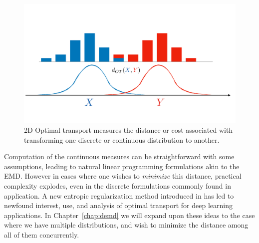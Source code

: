 \begin{figure}
	\centering
	\includegraphics[width=\textwidth,trim={0 5cm 0 10cm},clip]{2_bknd/ot.pdf}
	\caption[Distributions and Optimal Transport]{2D Optimal transport measures the distance or cost associated with transforming one discrete or continuous distribution to another.}
	\label{fig:bkndot}
\end{figure}
Computation of the continuous measures can be straightforward with some assumptions,
leading to natural linear programming formulations akin to the EMD.
However in cases where one wishes to \textit{minimize} this distance,
practical complexity explodes, even in the discrete
formulations commonly found in application.
A new entropic regularization method introduced in \cite{cuturi2013sinkhorn}
has led to newfound interest,
use, and analysis of optimal transport for deep learning applications.
In Chapter~\ref{chap:demd} we will expand upon these
ideas to the case where we have multiple distributions,
and wish to minimize the distance among all of them concurrently.
